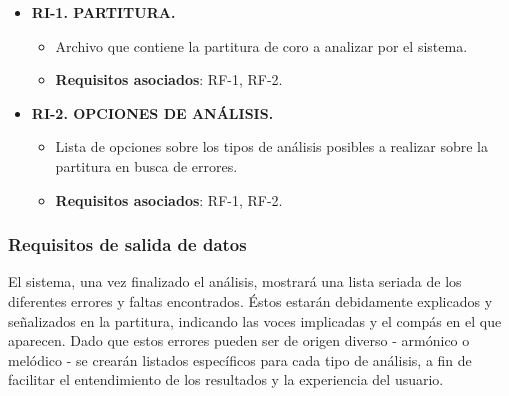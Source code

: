 \begin{itemize}

	\bigskip
	\item \textbf{RI-1. PARTITURA.}
		\begin{itemize}
			\item Archivo que contiene la partitura de coro a analizar por el sistema.
			\item \textbf{Requisitos asociados}: RF-1, RF-2.
		\end{itemize}

	\bigskip
	\item \textbf{RI-2. OPCIONES DE ANÁLISIS.}
		\begin{itemize}
			\item Lista de opciones sobre los tipos de análisis posibles a realizar sobre la partitura en busca de errores.
			\item \textbf{Requisitos asociados}: RF-1, RF-2.
		\end{itemize}

\end{itemize}


\subsubsection{Requisitos de salida de datos}

El sistema, una vez finalizado el análisis, mostrará una lista seriada de los diferentes errores y faltas encontrados. Éstos estarán debidamente explicados y señalizados en la partitura, indicando las voces implicadas y el compás en el que aparecen. Dado que estos errores pueden ser de origen diverso - armónico o melódico - se crearán listados específicos para cada tipo de análisis, a fin de facilitar el entendimiento de los resultados y la experiencia del usuario.   


